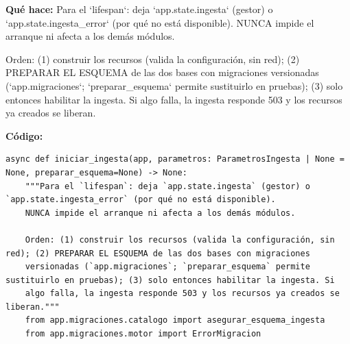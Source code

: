 \documentclass[11pt,a4paper]{article}
\begin{document}
\textbf{Qué hace:} Para el `lifespan`: deja `app.state.ingesta` (gestor) o `app.state.ingesta\_error` (por qué no está disponible).
NUNCA impide el arranque ni afecta a los demás módulos.

Orden: (1) construir los recursos (valida la configuración, sin red); (2) PREPARAR EL ESQUEMA de las dos bases con migraciones
versionadas (`app.migraciones`; `preparar\_esquema` permite sustituirlo en pruebas); (3) solo entonces habilitar la ingesta. Si
algo falla, la ingesta responde 503 y los recursos ya creados se liberan.

\textbf{Código:}
\begin{lstlisting}
async def iniciar_ingesta(app, parametros: ParametrosIngesta | None = None, preparar_esquema=None) -> None:
    """Para el `lifespan`: deja `app.state.ingesta` (gestor) o `app.state.ingesta_error` (por qué no está disponible).
    NUNCA impide el arranque ni afecta a los demás módulos.

    Orden: (1) construir los recursos (valida la configuración, sin red); (2) PREPARAR EL ESQUEMA de las dos bases con migraciones
    versionadas (`app.migraciones`; `preparar_esquema` permite sustituirlo en pruebas); (3) solo entonces habilitar la ingesta. Si
    algo falla, la ingesta responde 503 y los recursos ya creados se liberan."""
    from app.migraciones.catalogo import asegurar_esquema_ingesta
    from app.migraciones.motor import ErrorMigracion


\end{lstlisting}
\end{document}
